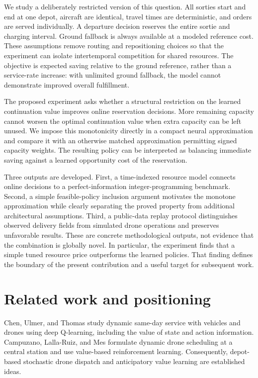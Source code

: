 \documentclass[11pt,a4paper]{article}
\begin{document}
We study a deliberately restricted version of this question. All sorties start and end at one depot, aircraft are identical, travel times are deterministic, and orders are served individually. A departure decision reserves the entire sortie and charging interval. Ground fallback is always available at a modeled reference cost. These assumptions remove routing and repositioning choices so that the experiment can isolate intertemporal competition for shared resources. The objective is expected saving relative to the ground reference, rather than a service-rate increase: with unlimited ground fallback, the model cannot demonstrate improved overall fulfillment.

The proposed experiment asks whether a structural restriction on the learned continuation value improves online reservation decisions. More remaining capacity cannot worsen the optimal continuation value when extra capacity can be left unused. We impose this monotonicity directly in a compact neural approximation and compare it with an otherwise matched approximation permitting signed capacity weights. The resulting policy can be interpreted as balancing immediate saving against a learned opportunity cost of the reservation.

Three outputs are developed. First, a time-indexed resource model connects online decisions to a perfect-information integer-programming benchmark. Second, a simple feasible-policy inclusion argument motivates the monotone approximation while clearly separating the proved property from additional architectural assumptions. Third, a public-data replay protocol distinguishes observed delivery fields from simulated drone operations and preserves unfavorable results. These are concrete methodological outputs, not evidence that the combination is globally novel. In particular, the experiment finds that a simple tuned resource price outperforms the learned policies. That finding defines the boundary of the present contribution and a useful target for subsequent work.

\section{Related work and positioning}
Chen, Ulmer, and Thomas \cite{chen} study dynamic same-day service with vehicles and drones using deep Q-learning, including the value of state and action information. Campuzano, Lalla-Ruiz, and Mes \cite{campuzano} formulate dynamic drone scheduling at a central station and use value-based reinforcement learning. Consequently, depot-based stochastic drone dispatch and anticipatory value learning are established ideas.
\end{document}
